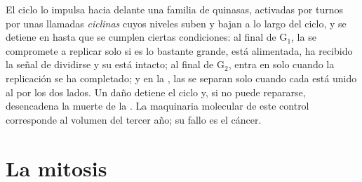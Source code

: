 \begin{proposition}\label{prop:b1:replication-mitosis:checkpoints}
El ciclo lo impulsa hacia delante una familia de  quinasas,
activadas por turnos por unas  llamadas \emph{ciclinas} cuyos
niveles suben y bajan a lo largo del ciclo, y se detiene en \emph{} hasta que se cumplen ciertas condiciones: al final de G$_1$, la
 se compromete a replicar solo si es lo bastante grande, está
alimentada, ha recibido la señal de dividirse y su  está intacto; al
final de G$_2$, entra en  solo cuando la replicación se ha
completado; y en la , las  se separan solo cuando cada
 está unido al  por los dos lados. Un daño detiene el ciclo y,
si no puede repararse, desencadena la muerte de la . La maquinaria
molecular de este control corresponde al volumen del tercer año; su fallo es
el cáncer.
\end{proposition}

\section{La mitosis}

